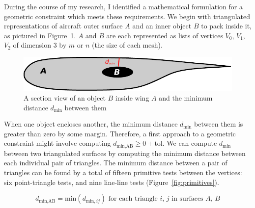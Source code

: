 \documentclass[11pt,letterpaper]{article}
\begin{document}
\qquad During the course of my research, I identified a mathematical formulation for a geometric constraint which meets these requirements.
We begin with triangulated representations of aircraft outer surface $A$ and an inner object $B$ to pack inside it, as pictured in Figure~\ref{fig:schematic}.
$A$ and $B$ are each represented as lists of vertices $V_0$, $V_1$, $V_2$ of dimension 3 by $m$ or $n$ (the size of each mesh).

\begin{figure}[ht]
  \centering
  \includegraphics[width=0.45\linewidth]{figures/schematic}
  \caption{A section view of an object $B$ inside wing $A$ and the minimum distance $d_\text{min}$ between them}
  \label{fig:schematic}
\end{figure}

\qquad When one object encloses another, the minimum distance $d_\text{min}$ between them is greater than zero by some margin.
Therefore, a first approach to a geometric constraint might involve computing $d_\text{min,AB} \geq 0 + \text{tol}$.
We can compute $d_\text{min}$ between two triangulated surfaces by computing the minimum distance between each individual pair of triangles.
The minimum distance between a pair of triangles can be found by a total of fifteen primitive tests between the vertices: six point-triangle tests, and nine line-line tests (Figure~\ref{fig:primitives}). %

\begin{equation}
  \label{eq:dmin}
  d_\text{min,AB} = \text{min}(d_{\text{min},ij}) \text{ for each triangle } i, \, j \text{ in surfaces } A, \, B
\end{equation}
\end{document}
